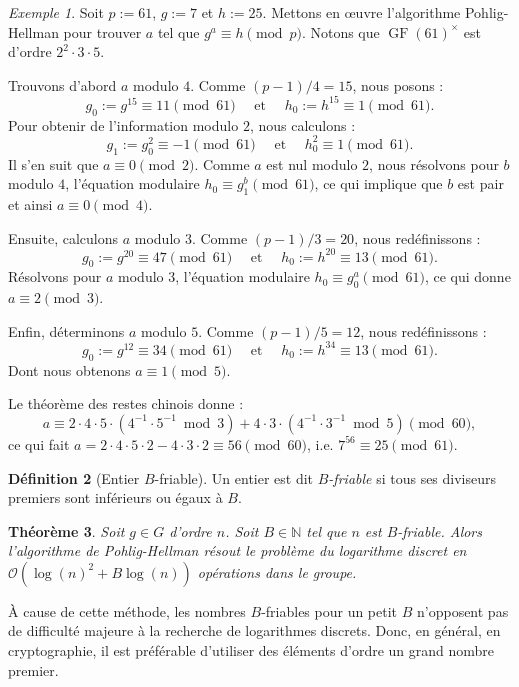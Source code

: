 \documentclass[a4paper, titlepage]{article}
\newtheorem{theo}{Théorème}[section]
\theoremstyle{definition}
\newtheorem{defi}[theo]{Définition}
\theoremstyle{remark}
\newtheorem{exem}[theo]{Exemple}
\def\N{\mathbb N}
\def\O{\mathcal O}
\def\gf{\operatorname{GF}}
\begin{document}
\begin{exem}
Soit $p := 61$, $g := 7$ et $h := 25$. Mettons en \oe uvre l'algorithme Pohlig-Hellman pour trouver $a$ tel que $ g^a \equiv h \pmod{p}$. Notons que $\gf(61)^\times$ est d'ordre $2^2\cdot3\cdot5$. 

Trouvons d'abord $a$ modulo $4$. Comme $(p-1)/4 = 15$, nous posons :
$$g_0 := g^{15} \equiv 11 \pmod{61} \quad\text{ et }\quad h_0 := h^{15} \equiv 1 \pmod{61}.$$
Pour obtenir de l'information modulo $2$, nous calculons :
$$g_1 := g_0^{2} \equiv -1 \pmod{61} \quad\text{ et }\quad h_0^2 \equiv 1 \pmod{61}.$$
Il s'en suit que $a \equiv 0 \pmod{2}$. Comme $a$ est nul modulo $2$, nous résolvons pour $b$ modulo $4$, l'équation modulaire $h_0 \equiv g_1^b \pmod{61}$, ce qui implique que $b$ est pair et ainsi $a \equiv 0 \pmod{4}$.

Ensuite, calculons $a$ modulo $3$. Comme $(p-1)/3 = 20$, nous redéfinissons :
$$g_0 := g^{20} \equiv 47 \pmod{61} \quad\text{ et }\quad h_0 := h^{20} \equiv 13 \pmod{61}.$$
Résolvons pour $a$ modulo $3$, l'équation modulaire $h_0 \equiv g_0^a \pmod{61}$, ce qui donne $a \equiv 2 \pmod{3}.$

Enfin, déterminons $a$ modulo $5$. Comme $(p-1)/5 = 12$, nous redéfinissons :
$$g_0 := g^{12} \equiv 34 \pmod{61} \quad\text{ et }\quad h_0 := h^{34} \equiv 13 \pmod{61}.$$
Dont nous obtenons $a \equiv 1 \pmod{5}.$

Le théorème des restes chinois donne :
$$a\equiv 2\cdot4\cdot5\cdot(4^{-1}\cdot5^{-1} \bmod{3}) + 4\cdot3\cdot(4^{-1}\cdot3^{-1} \bmod{5}) \pmod{60},$$
ce qui fait $a = 2\cdot4\cdot5\cdot2 - 4\cdot3\cdot2 \equiv 56 \pmod{60}$, i.e. $7^{56} \equiv 25 \pmod{61}$.
\end{exem}

\begin{defi}[Entier $B$-friable]
Un entier est dit \textit{$B$-friable} si tous ses diviseurs premiers sont inférieurs ou égaux à $B$.
\end{defi}

\begin{theo}
Soit $g \in G$ d'ordre $n$. Soit $B\in\N$ tel que $n$ est $B$-friable. Alors l'algorithme de Pohlig-Hellman résout le problème du logarithme discret en $\O(\log(n)^2 + B\log(n))$ opérations dans le groupe.
\end{theo}

\`A cause de cette méthode, les nombres $B$-friables pour un petit $B$ n'opposent pas de difficulté majeure à la recherche de logarithmes discrets. Donc, en général, en cryptographie, il est préférable d'utiliser des éléments d'ordre un grand nombre premier.
\end{document}
